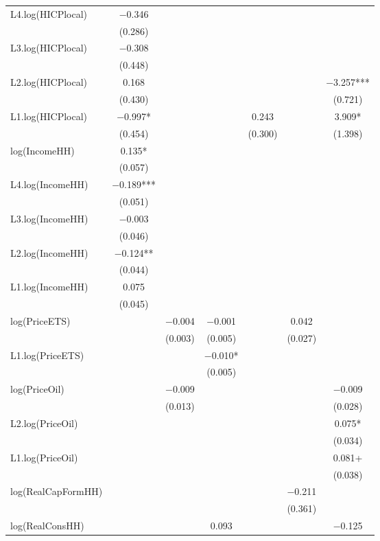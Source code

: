 \begin{table}
{\begin{tabular}[t]{lcccccc}
L4.log(HICPlocal) & \num{-0.346} &  &  &  &  & \\
 & (\num{0.286}) &  &  &  &  & \\
L3.log(HICPlocal) & \num{-0.308} &  &  &  &  & \\
 & (\num{0.448}) &  &  &  &  & \\
L2.log(HICPlocal) & \num{0.168} &  &  &  &  & \num{-3.257}***\\
 & (\num{0.430}) &  &  &  &  & (\num{0.721})\\
L1.log(HICPlocal) & \num{-0.997}* &  &  & \num{0.243} &  & \num{3.909}*\\
 & (\num{0.454}) &  &  & (\num{0.300}) &  & (\num{1.398})\\
log(IncomeHH) & \num{0.135}* &  &  &  &  & \\
 & (\num{0.057}) &  &  &  &  & \\
L4.log(IncomeHH) & \num{-0.189}*** &  &  &  &  & \\
 & (\num{0.051}) &  &  &  &  & \\
L3.log(IncomeHH) & \num{-0.003} &  &  &  &  & \\
 & (\num{0.046}) &  &  &  &  & \\
L2.log(IncomeHH) & \num{-0.124}** &  &  &  &  & \\
 & (\num{0.044}) &  &  &  &  & \\
L1.log(IncomeHH) & \num{0.075} &  &  &  &  & \\
 & (\num{0.045}) &  &  &  &  & \\
log(PriceETS) &  & \num{-0.004} & \num{-0.001} &  & \num{0.042} & \\
 &  & (\num{0.003}) & (\num{0.005}) &  & (\num{0.027}) & \\
L1.log(PriceETS) &  &  & \num{-0.010}* &  &  & \\
 &  &  & (\num{0.005}) &  &  & \\
log(PriceOil) &  & \num{-0.009} &  &  &  & \num{-0.009}\\
 &  & (\num{0.013}) &  &  &  & (\num{0.028})\\
L2.log(PriceOil) &  &  &  &  &  & \num{0.075}*\\
 &  &  &  &  &  & (\num{0.034})\\
L1.log(PriceOil) &  &  &  &  &  & \num{0.081}+\\
 &  &  &  &  &  & (\num{0.038})\\
log(RealCapFormHH) &  &  &  &  & \num{-0.211} & \\
 &  &  &  &  & (\num{0.361}) & \\
log(RealConsHH) &  &  & \num{0.093} &  &  & \num{-0.125}\\

\end{tabular}}
\end{table}
